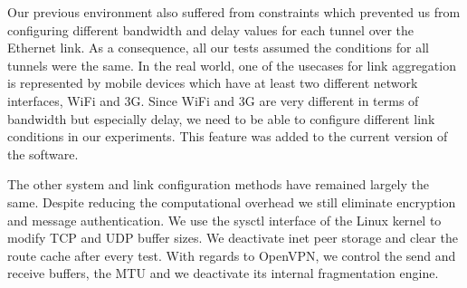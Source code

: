 Our previous environment also suffered from constraints which prevented us from configuring different bandwidth and delay values for each tunnel over the Ethernet link. As a consequence, all our tests assumed the conditions for all tunnels were the same. In the real world, one of the usecases for link aggregation is represented by mobile devices which have at least two different network interfaces, WiFi and 3G. Since WiFi and 3G are very different in terms of bandwidth but especially delay, we need to be able to configure different link conditions in our experiments. This feature was added to the current version of the software.

The other system and link configuration methods have remained largely the
same. Despite reducing the computational overhead we still eliminate
encryption and message authentication. We use the sysctl interface of the
Linux kernel to modify TCP and UDP buffer sizes. We deactivate inet peer
storage and clear the route cache after every test. With regards to OpenVPN,
we control the send and receive buffers, the MTU and we deactivate its
internal fragmentation engine.

